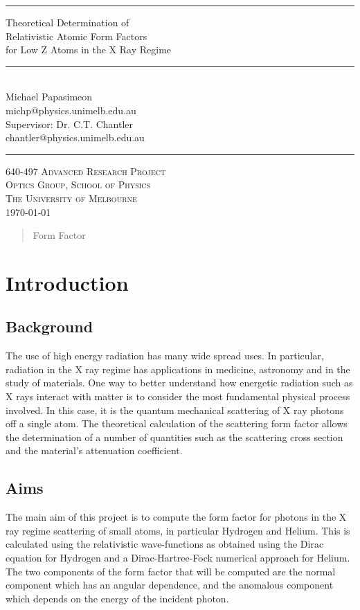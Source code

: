 \documentclass[a4paper,titlepage]{report}
\newcommand{\HRule}{\rule{\textwidth}{1mm}}
\newcommand{\Trule}{\rule{\textwidth}{0.1pt}}
\newcommand{\maketitlepage}[2]{
    \begin{titlepage}
    \vspace*{\stretch{1}}
    \HRule
    \begin{flushright}
        {\textsf{{ \Huge  #1} }}
        \\[5mm]
        \Trule
        \\[5mm]
        \Large \textsf{#2}
    \end{flushright}
    \HRule
    \vspace*{\stretch{2}}
    \begin{center}
        \Large\textsc{640-497 Advanced Research Project\\
                      Optics Group, 
                      School of Physics\\
                      The University of Melbourne \\
                      \today}
    \end{center}
    \end{titlepage}
}
\begin{document}
    \maketitlepage{Theoretical Determination of\\
                   \vspace{1mm} 
                   Relativistic Atomic Form Factors\\
                   \vspace{5mm}
                   for Low Z Atoms in the X Ray Regime}%
                   {Michael Papasimeon \\ michp@physics.unimelb.edu.au 
                   \\[5mm]
                   Supervisor: Dr. C.T. Chantler\\
                   chantler@physics.unimelb.edu.au}
    \begin{abstract}
        Form Factor
    \end{abstract}
    \tableofcontents
    \listoftables
    \newpage

\chapter{Introduction}
\section{Background}
The use of high energy radiation has many wide spread uses. In
particular, radiation in the X ray regime has applications in medicine,
astronomy and in the study of materials. 
One way to better understand how energetic radiation such as X rays
interact with matter is to consider the most fundamental physical
process involved. In this case, it is the quantum mechanical scattering
of X ray photons off a single atom.
The theoretical calculation of the scattering form factor allows the
determination of a number of quantities such as the scattering cross
section and the material's attenuation coefficient. 

\section{Aims}
The main aim of this project is to compute the form factor for photons
in the X ray regime scattering of small atoms, in particular Hydrogen
and Helium. This is calculated using the relativistic wave-functions as
obtained using the Dirac equation for Hydrogen and a Dirac-Hartree-Fock
numerical approach for Helium. The two components of the form factor
that will be computed are the normal component which has an angular
dependence, and the anomalous component which depends on the energy of
the incident photon.
\end{document}
